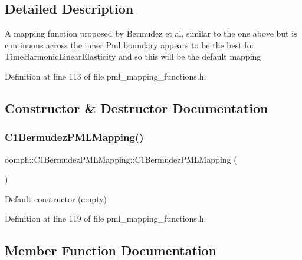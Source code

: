\subsection{Detailed Description}
A mapping function proposed by Bermudez et al, similar to the one above but is continuous across the inner Pml boundary appears to be the best for Time\+Harmonic\+Linear\+Elasticity and so this will be the default mapping 

Definition at line 113 of file pml\+\_\+mapping\+\_\+functions.\+h.



\subsection{Constructor \& Destructor Documentation}
\mbox{\label{classoomph_1_1C1BermudezPMLMapping_aad48d50b2bffcd92693f24ccd2c60856}} 
\subsubsection{\texorpdfstring{C1\+Bermudez\+P\+M\+L\+Mapping()}{C1BermudezPMLMapping()}}
{\footnotesize\ttfamily oomph\+::\+C1\+Bermudez\+P\+M\+L\+Mapping\+::\+C1\+Bermudez\+P\+M\+L\+Mapping (\begin{DoxyParamCaption}{ }\end{DoxyParamCaption})\hspace{0.3cm}{\ttfamily [inline]}}



Default constructor (empty) 



Definition at line 119 of file pml\+\_\+mapping\+\_\+functions.\+h.



\subsection{Member Function Documentation}
\mbox{\label{classoomph_1_1C1BermudezPMLMapping_a6cd89443e778419f9f107971f5176607}} 

